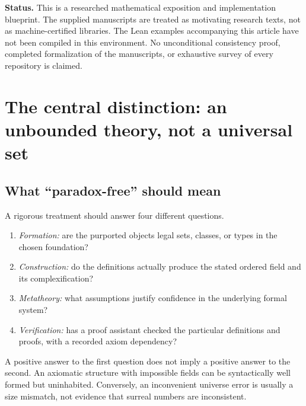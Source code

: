 \documentclass[11pt,letterpaper]{article}
\theoremstyle{definition}
\theoremstyle{remark}
\numberwithin{equation}{section}
\begin{document}
\begin{titlepage}
\begin{minipage}{0.94\textwidth}
\begin{abstract}
A source inspection of current Lean material is included, with an immutable repository revision and exact dependency versions. It distinguishes an existing surreal field instance and small-support Hahn-series infrastructure from mathematical bridges and analytic theorems not verified in this study.
\end{abstract}
\end{minipage}
\vfill
\begin{minipage}{0.94\textwidth}\small
\textbf{Status.} This is a researched mathematical exposition and implementation blueprint. The supplied manuscripts are treated as motivating research texts, not as machine-certified libraries. The Lean examples accompanying this article have not been compiled in this environment. No unconditional consistency proof, completed formalization of the manuscripts, or exhaustive survey of every repository is claimed.
\end{minipage}
\end{titlepage}
\tableofcontents
\newpage

\section{The central distinction: an unbounded theory, not a universal set}\label{sec:orientation}

\subsection{What ``paradox-free'' should mean}
A rigorous treatment should answer four different questions.
\begin{enumerate}
\item \emph{Formation:} are the purported objects legal sets, classes, or types in the chosen foundation?
\item \emph{Construction:} do the definitions actually produce the stated ordered field and its complexification?
\item \emph{Metatheory:} what assumptions justify confidence in the underlying formal system?
\item \emph{Verification:} has a proof assistant checked the particular definitions and proofs, with a recorded axiom dependency?
\end{enumerate}
A positive answer to the first question does not imply a positive answer to the second. An axiomatic structure with impossible fields can be syntactically well formed but uninhabited. Conversely, an inconvenient universe error is usually a size mismatch, not evidence that surreal numbers are inconsistent.
\end{document}
